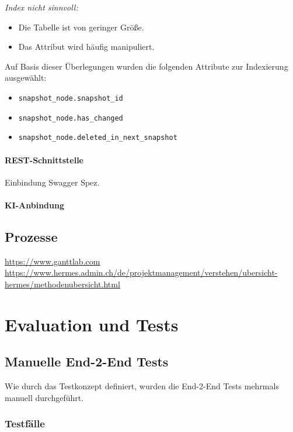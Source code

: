 \documentclass[a4paper,12pt]{report}
\begin{document}
    \textit{Index nicht sinnvoll:}
    \begin{itemize}
        \item Die Tabelle ist von geringer Größe.
        \item Das Attribut wird häufig manipuliert.
    \end{itemize}

    Auf Basis dieser Überlegungen wurden die folgenden Attribute zur Indexierung ausgewählt:
    \begin{itemize}
        \item \texttt{snapshot\_node.snapshot\_id}
        \item \texttt{snapshot\_node.has\_changed}
        \item \texttt{snapshot\_node.deleted\_in\_next\_snapshot}
    \end{itemize}
    \clearpage

    \subsubsection{REST-Schnittstelle}
    Einbindung Swagger Spez.
    \clearpage

    \subsubsection{KI-Anbindung}
    \clearpage

    \clearpage


    \section{Prozesse}
    \url{https://www.ganttlab.com} \\
    \url{https://www.hermes.admin.ch/de/projektmanagement/verstehen/ubersicht-hermes/methodenubersicht.html}


    \chapter{Evaluation und Tests}


    \section{Manuelle End-2-End Tests}
    Wie durch das Testkonzept definiert, wurden die End-2-End Tests mehrmals manuell durchgeführt.

    \subsection{Testfälle}
\end{document}
